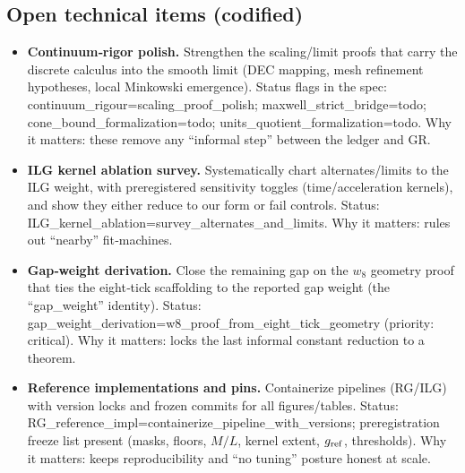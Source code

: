 \documentclass[11pt]{article}
\begin{document}
\subsection{Open technical items (codified)}
\begin{itemize}
  \item \textbf{Continuum‑rigor polish.} Strengthen the scaling/limit proofs that carry the discrete calculus into the smooth limit (DEC mapping, mesh refinement hypotheses, local Minkowski emergence). Status flags in the spec: continuum\_rigour=scaling\_proof\_polish; maxwell\_strict\_bridge=todo; cone\_bound\_formalization=todo; units\_quotient\_formalization=todo. Why it matters: these remove any “informal step” between the ledger and GR.
  \item \textbf{ILG kernel ablation survey.} Systematically chart alternates/limits to the ILG weight, with preregistered sensitivity toggles (time/acceleration kernels), and show they either reduce to our form or fail controls. Status: ILG\_kernel\_ablation=survey\_alternates\_and\_limits. Why it matters: rules out “nearby” fit‑machines.
  \item \textbf{Gap‑weight derivation.} Close the remaining gap on the $w_8$ geometry proof that ties the eight‑tick scaffolding to the reported gap weight (the “gap\_weight” identity). Status: gap\_weight\_derivation=w8\_proof\_from\_eight\_tick\_geometry (priority: critical). Why it matters: locks the last informal constant reduction to a theorem.
  \item \textbf{Reference implementations and pins.} Containerize pipelines (RG/ILG) with version locks and frozen commits for all figures/tables. Status: RG\_reference\_impl=containerize\_pipeline\_with\_versions; preregistration freeze list present (masks, floors, $M/L$, kernel extent, $g_{\rm ref}$, thresholds). Why it matters: keeps reproducibility and “no tuning” posture honest at scale.
\end{itemize}
\end{document}
